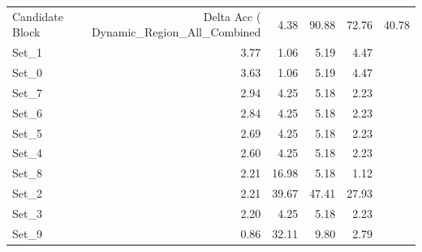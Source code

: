 \begin{tabular}{lrrrr}
\toprule
Candidate Block & Delta Acc (%
\midrule
Dynamic_Region_All_Combined & 4.38 & 90.88 & 72.76 & 40.78 \\
Set_1 & 3.77 & 1.06 & 5.19 & 4.47 \\
Set_0 & 3.63 & 1.06 & 5.19 & 4.47 \\
Set_7 & 2.94 & 4.25 & 5.18 & 2.23 \\
Set_6 & 2.84 & 4.25 & 5.18 & 2.23 \\
Set_5 & 2.69 & 4.25 & 5.18 & 2.23 \\
Set_4 & 2.60 & 4.25 & 5.18 & 2.23 \\
Set_8 & 2.21 & 16.98 & 5.18 & 1.12 \\
Set_2 & 2.21 & 39.67 & 47.41 & 27.93 \\
Set_3 & 2.20 & 4.25 & 5.18 & 2.23 \\
Set_9 & 0.86 & 32.11 & 9.80 & 2.79 \\
\bottomrule
\end{tabular}
